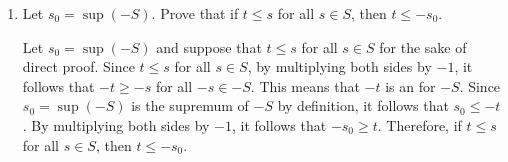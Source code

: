 \begin{enumerate}
\begin{enumerate}
\begin{subprove}
      Therefore, $-s_0 \leq s$ for all $s \in S$.
    \end{subprove}
    \item Let $s_0=\sup (-S)$. Prove that if $t \leq s$ for all $s \in S$, then $t \leq -s_0$.
    \begin{subprove}
      Let $s_0 = \sup(-S)$ and suppose that $t \leq s$ for all $s \in S$ for the sake of direct proof.      
      Since $t \leq s$ for all $s \in S$, by multiplying both sides by $-1$, it follows that $-t \geq -s$ for all $-s \in -S$.
      This means that $-t$ is an  for $-S$.
      Since $s_0 = \sup(-S)$ is the supremum of $-S$ by definition, it follows that $s_0 \leq -t$.
      By multiplying both sides by $-1$, it follows that $-s_0 \geq t$.
      Therefore, if $t \leq s$ for all $s \in S$, then $t \leq -s_0$.
    \end{subprove}



\end{enumerate}
\end{enumerate}
